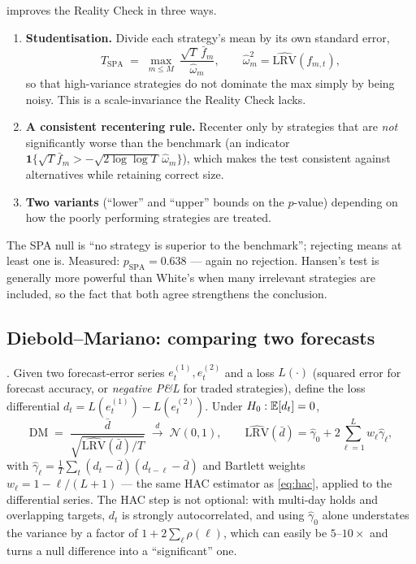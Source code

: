 \cite{hansen2005test} improves the Reality Check in three ways.
\begin{enumerate}
  \item \textbf{Studentisation.} Divide each strategy's mean by its own standard error,
    \begin{equation}
      T_{\text{SPA}} \;=\; \max_{m\le M}\ \frac{\sqrt{T}\,\bar f_m}{\hat\omega_m},
      \qquad \hat\omega_m^2 = \widehat{\mathrm{LRV}}(f_{m,t}),
      \label{eq:spa}
    \end{equation}
    so that high-variance strategies do not dominate the max simply by being noisy. This
    is a scale-invariance the Reality Check lacks.
  \item \textbf{A consistent recentering rule.} Recenter only by strategies that are
    \emph{not} significantly worse than the benchmark (an indicator $\mathbf 1\{\sqrt T
    \bar f_m > -\sqrt{2\log\log T}\,\hat\omega_m\}$), which makes the test consistent
    against alternatives while retaining correct size.
  \item \textbf{Two variants} (``lower'' and ``upper'' bounds on the $p$-value) depending
    on how the poorly performing strategies are treated.
\end{enumerate}
The SPA null is ``no strategy is superior to the benchmark''; rejecting means at least one
is. Measured: $p_{\text{SPA}}=0.638$ --- again no rejection. Hansen's test is generally
more powerful than White's when many irrelevant strategies are included, so the fact that
both agree strengthens the conclusion.

\subsection{Diebold--Mariano: comparing two forecasts}
\label{sec:mt:dm}

\cite{dieboldmariano1995}. Given two forecast-error series $e^{(1)}_t,e^{(2)}_t$ and a
loss $L(\cdot)$ (squared error for forecast accuracy, or \emph{negative P\&L} for traded
strategies), define the loss differential $d_t = L(e^{(1)}_t)-L(e^{(2)}_t)$. Under
$H_0:\mathbb{E}[d_t]=0$,
\begin{equation}
  \mathrm{DM} \;=\; \frac{\bar d}{\sqrt{\widehat{\mathrm{LRV}}(\bar d)/T}}
  \;\xrightarrow{\ d\ }\;\mathcal N(0,1),
  \qquad
  \widehat{\mathrm{LRV}}(\bar d) = \hat\gamma_0 + 2\sum_{\ell=1}^{L}w_\ell\hat\gamma_\ell ,
  \label{eq:dm}
\end{equation}
with $\hat\gamma_\ell = \frac1T\sum_t (d_t-\bar d)(d_{t-\ell}-\bar d)$ and Bartlett
weights $w_\ell=1-\ell/(L+1)$ --- the same HAC estimator as \eqref{eq:hac}, applied to the
differential series. The HAC step is not optional: with multi-day holds and overlapping
targets, $d_t$ is strongly autocorrelated, and using $\hat\gamma_0$ alone understates the
variance by a factor of $1+2\sum_\ell\rho(\ell)$, which can easily be $5$--$10\times$ and
turns a null difference into a ``significant'' one.

